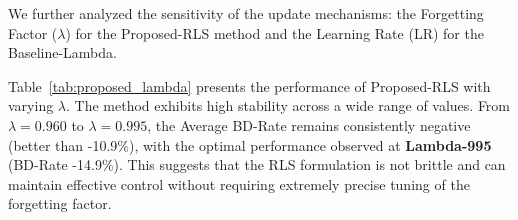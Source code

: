 We further analyzed the sensitivity of the update mechanisms: the Forgetting Factor ($\lambda$) for the Proposed-RLS method and the Learning Rate (LR) for the Baseline-Lambda.

Table~\ref{tab:proposed_lambda} presents the performance of Proposed-RLS with varying $\lambda$. The method exhibits high stability across a wide range of values. From $\lambda=0.960$ to $\lambda=0.995$, the Average BD-Rate remains consistently negative (better than -10.9\%), with the optimal performance observed at \textbf{Lambda-995} (BD-Rate -14.9\%). This suggests that the RLS formulation is not brittle and can maintain effective control without requiring extremely precise tuning of the forgetting factor.

\begin{table}[htbp]
    \centering
    \caption{Ablation Study on Forgetting Factor $\lambda$ (Proposed-RLS). \textbf{Bold} indicates the best performance. (Note: Consistently negative BD-Rate indicates high stability.)}
    \label{tab:proposed_lambda}
\end{table}
